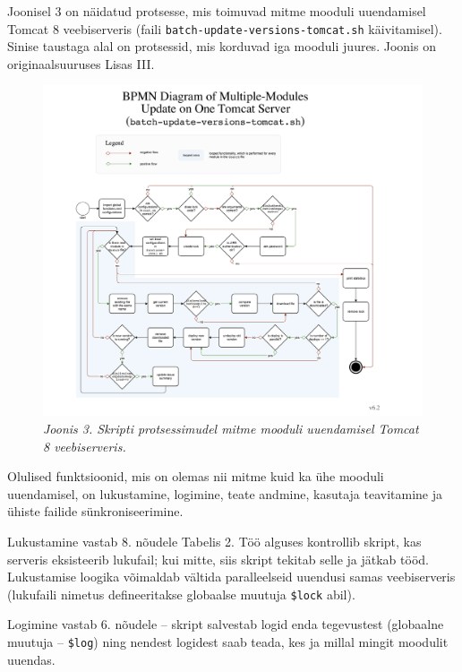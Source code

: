 \documentclass[12pt]{article}
\newcommand{\code}[1]{\texttt{#1}}
\begin{document}
   Joonisel 3 on näidatud protsesse, mis toimuvad mitme mooduli uuendamisel Tomcat 8 veebiserveris (faili \code{batch-update-versions-tomcat.sh} käivitamisel). Sinise taustaga alal on protsessid, mis korduvad iga mooduli juures. Joonis on originaalsuuruses Lisas III.
   
   \begin{figure}[H]
     \begin{center}
       \includegraphics[width=\textwidth]{diagrams/BPMN-diagram-multiple-module-update-tomcat.png}
       \caption*{\textit{Joonis 3. Skripti protsessimudel mitme mooduli uuendamisel Tomcat 8 veebiserveris.}}
     \end{center}
   \end{figure}
   
   \newpage
   
   Olulised funktsioonid, mis on olemas nii mitme kuid ka ühe mooduli uuendamisel, on lukustamine, logimine, teate andmine, kasutaja teavitamine ja ühiste failide sünkroniseerimine.
   
   Lukustamine vastab 8. nõudele Tabelis 2. Töö alguses kontrollib skript, kas serveris eksisteerib lukufail; kui mitte, siis skript tekitab selle ja jätkab tööd. Lukustamise loogika võimaldab vältida paralleelseid uuendusi samas veebiserveris (lukufaili nimetus defineeritakse globaalse muutuja \code{\$lock} abil).
   
   Logimine vastab 6. nõudele \--- skript salvestab logid enda tegevustest (globaalne muutuja \--- \code{\$log}) ning nendest logidest saab teada, kes ja millal mingit moodulit uuendas.
   
\end{document}

